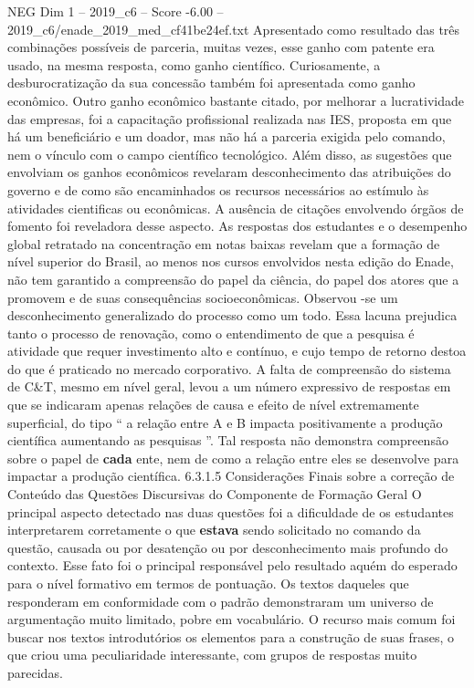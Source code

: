 \begin{textsample}{NEG Dim 1 – 2019\_c6 – Score -6.00 – 2019\_c6/enade\_2019\_med\_cf41be24ef.txt}
Apresentado como resultado das três combinações possíveis de parceria, muitas vezes, esse ganho com patente era usado, na mesma resposta, como ganho científico.
Curiosamente, a desburocratização da sua concessão também foi apresentada como ganho econômico.
Outro ganho econômico bastante citado, por melhorar a lucratividade das empresas, foi a capacitação profissional realizada nas IES, proposta em que há um beneficiário e um doador, mas não há a parceria exigida pelo comando, nem o vínculo com o campo científico tecnológico.
Além disso, as sugestões que envolviam os ganhos econômicos revelaram desconhecimento das atribuições do governo e de como são encaminhados os recursos necessários ao estímulo às atividades cientificas ou econômicas.
A ausência de citações envolvendo órgãos de fomento foi reveladora desse aspecto.
As respostas dos estudantes e o desempenho global retratado na concentração em notas baixas revelam que a formação de nível superior do Brasil, ao menos nos cursos envolvidos nesta edição do Enade, não tem garantido a compreensão do papel da ciência, do papel dos atores que a promovem e de suas consequências socioeconômicas.
Observou -se um desconhecimento generalizado do processo como um todo.
Essa lacuna prejudica tanto o processo de renovação, como o entendimento de que a pesquisa é atividade que requer investimento alto e contínuo, e cujo tempo de retorno destoa do que é praticado no mercado corporativo.
A falta de compreensão do sistema de C\&T, mesmo em nível geral, levou a um número expressivo de respostas em que se indicaram apenas relações de causa e efeito de nível extremamente superficial, do tipo “ a relação entre A e B impacta positivamente a produção científica aumentando as pesquisas ”.
Tal resposta não demonstra compreensão sobre o papel de \textbf{cada} ente, nem de como a relação entre eles se desenvolve para impactar a produção científica. 6.3.1.5 Considerações Finais sobre a correção de Conteúdo das Questões Discursivas do Componente de Formação Geral O principal aspecto detectado nas duas questões foi a dificuldade de os estudantes interpretarem corretamente o que \textbf{estava} sendo solicitado no comando da questão, causada ou por desatenção ou por desconhecimento mais profundo do contexto.
Esse fato foi o principal responsável pelo resultado aquém do esperado para o nível formativo em termos de pontuação.
Os textos daqueles que responderam em conformidade com o padrão demonstraram um universo de argumentação muito limitado, pobre em vocabulário.
O recurso mais comum foi buscar nos textos introdutórios os elementos para a construção de suas frases, o que criou uma peculiaridade interessante, com grupos de respostas muito parecidas.

\end{textsample}
